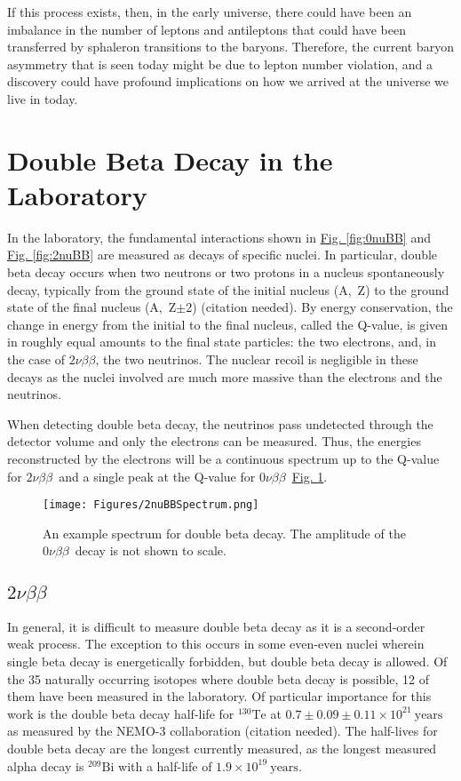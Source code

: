 \documentclass[12pt,a4paper]{article}
\newcommand{\zeronubb}{$0\nu \beta \beta$}
\newcommand{\twonubb}{$2\nu \beta \beta$}
\begin{document}
If this process exists, then, in the early universe, there could have been an imbalance in the number of leptons and antileptons that could have been transferred by sphaleron transitions to the baryons. Therefore, the current baryon asymmetry that is seen today might be due to lepton number violation, and a discovery could have profound implications on how we arrived at the universe we live in today.


\section{Double Beta Decay in the Laboratory}

In the laboratory, the fundamental interactions shown in \hyperref[fig:0nuBB]{Fig. \ref*{fig:0nuBB}} and \hyperref[fig:2nuBB]{Fig. \ref*{fig:2nuBB}} are measured as decays of specific nuclei. In particular, double beta decay occurs when two neutrons or two protons in a nucleus spontaneously decay, typically from the ground state of the initial nucleus (A,~Z) to the ground state of the final nucleus (A,~Z$\pm$2) (\color{blue}citation needed\color{black}). By energy conservation, the change in energy from the initial to the final nucleus, called the Q-value, is given in roughly equal amounts to the final state particles: the two electrons, and, in the case of \twonubb, the two neutrinos. The nuclear recoil is negligible in these decays as the nuclei involved are much more massive than the electrons and the neutrinos. 

When detecting double beta decay, the neutrinos pass undetected through the detector volume and only the electrons can be measured. Thus, the energies reconstructed by the electrons will be a continuous spectrum up to the Q-value for \twonubb~and a single peak at the Q-value for \zeronubb~\hyperref[fig:2nubbspectrum]{Fig. \ref*{fig:2nubbspectrum}}.

\begin{figure} [h]
\centering
\texttt{[image: Figures/2nuBBSpectrum.png]}
\caption{An example spectrum for double beta decay. The amplitude of the \zeronubb~decay is not shown to scale.}
\label{fig:2nubbspectrum}
\end{figure}


\subsection{\twonubb}
In general, it is difficult to measure double beta decay as it is a second-order weak process. The exception to this occurs in some even-even nuclei wherein single beta decay is energetically forbidden, but double beta decay is allowed. Of the 35 naturally occurring isotopes where double beta decay is possible, 12 of them have been measured in the laboratory. Of particular importance for this work is the double beta decay half-life for $^{130}\textrm{Te}$ at $0.7 \pm 0.09 \pm 0.11 \times 10^{21}~\textrm{years}$ as measured by the NEMO-3 collaboration (\color{blue}citation needed\color{black}). The half-lives for double beta decay are the longest currently measured, as the longest measured alpha decay is $^{209}\textrm{Bi}$ with a half-life of $1.9 \times 10^{19}~\textrm{years}$.
\end{document}
